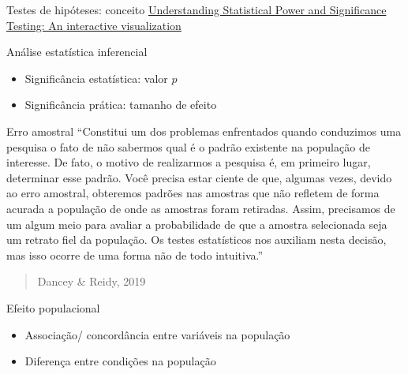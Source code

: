\documentclass[
  ignorenonframetext,
]{beamer}
\providecommand{\tightlist}{%
  \setlength{\itemsep}{0pt}\setlength{\parskip}{0pt}}
\begin{document}
\begin{frame}{Testes de hipóteses: conceito}
\protect\hypertarget{testes-de-hipuxf3teses-conceito}{}
\href{http://rpsychologist.com/d3/NHST/}{Understanding Statistical Power
and Significance Testing: An interactive visualization}
\end{frame}

\begin{frame}{Análise estatística inferencial}
\protect\hypertarget{anuxe1lise-estatuxedstica-inferencial}{}
\begin{itemize}
\tightlist
\item
  Significância estatística: valor \(p\)
\item
  Significância prática: tamanho de efeito
\end{itemize}
\end{frame}

\begin{frame}{Erro amostral}
\protect\hypertarget{erro-amostral}{}
``Constitui um dos problemas enfrentados quando conduzimos uma pesquisa
o fato de não sabermos qual é o padrão existente na população de
interesse. De fato, o motivo de realizarmos a pesquisa é, em primeiro
lugar, determinar esse padrão. Você precisa estar ciente de que, algumas
vezes, devido ao erro amostral, obteremos padrões nas amostras que não
refletem de forma acurada a população de onde as amostras foram
retiradas. Assim, precisamos de um algum meio para avaliar a
probabilidade de que a amostra selecionada seja um retrato fiel da
população. Os testes estatísticos nos auxiliam nesta decisão, mas isso
ocorre de uma forma não de todo intuitiva.''

\begin{quote}
Dancey \& Reidy, 2019
\end{quote}
\end{frame}

\begin{frame}{Efeito populacional}
\protect\hypertarget{efeito-populacional}{}
\begin{itemize}
\tightlist
\item
  Associação/ concordância entre variáveis na população
\item
  Diferença entre condições na população
\end{itemize}
\end{frame}
\end{document}
